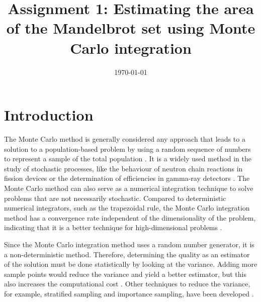 \documentclass{uva-inf-article}
\title{Assignment 1: Estimating the area of the Mandelbrot set using Monte Carlo integration}
\date{\today}
\begin{document}
\maketitle

\justifying





\section{Introduction}

The Monte Carlo method is generally considered any approach that leads to a solution to a population-based problem by using a random sequence of numbers to represent a sample of the total population \parencite{halton1970}. It is a widely used method in the study of stochastic processes, like the behaviour of neutron chain reactions in fission devices \parencite{eckhardt1987} or the determination of efficiencies in gamma-ray detectors \parencite{raeside1976}.
The Monte Carlo method can also serve as a numerical integration technique to solve problems that are not necessarily stochastic. 
Compared to deterministic numerical integrators, such as the trapezoidal rule, the Monte Carlo integration method has a convergence rate independent of the dimensionality of the problem, indicating that it is a better technique for high-dimensional problems \parencite{james1980}.

Since the Monte Carlo integration method uses a random number generator, it is a non-deterministic method. Therefore, determining the quality as an estimator of the solution must be done statistically by looking at the variance.
Adding more sample points would reduce the variance and yield a better estimator, but this also increases the computational cost \parencite{james1980}.
Other techniques to reduce the variance, for example, stratified sampling and importance sampling, have been developed \parencite{james1980, kroese2012}.
\end{document}
